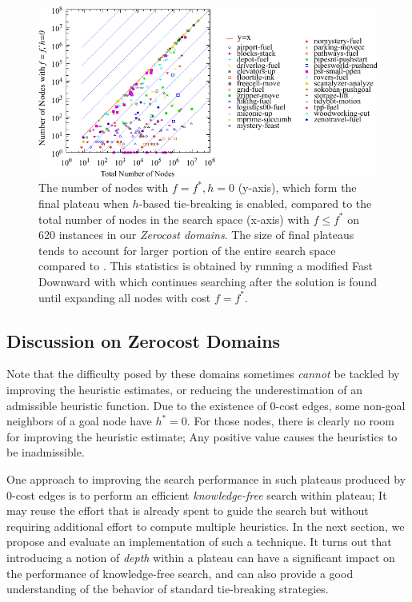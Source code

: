 \begin{figure}[htbp]
  \centering
  \includegraphics{tables/aaai16-frontier/zerocost/lmcut_frontier-front.pdf}
  \caption{
 The number of nodes with $f=f^*, h=0$ (y-axis), which form
  the final plateau when $h$-based tie-breaking is enabled, compared to
 the total number of nodes in the search space (x-axis) with
 $f\leq f^*$ on 620 instances in our \emph{Zerocost domains}.
 The size of final plateaus tends to account for larger portion of the
 entire search space compared to .
 This statistics is obtained by running a modified Fast Downward with
 \lmcut which continues searching after the solution is found
 until expanding all nodes with cost $f=f^*$.
 }
 \label{fig:plateau-zerocost}
\end{figure}

\subsection{Discussion on Zerocost Domains}

Note that the difficulty posed by these domains sometimes \emph{cannot}
be tackled by improving the heuristic estimates, or reducing the
underestimation of an admissible heuristic function.  Due to the
existence of 0-cost edges, some non-goal neighbors of a goal node 
have $h^*=0$. For those nodes,
there is clearly no room for improving the heuristic estimate; Any positive
value causes the heuristics to be inadmissible.

One approach to improving the search performance in such plateaus
produced by 0-cost edges is to perform an efficient
\emph{knowledge-free} search within plateau; It may reuse the effort
that is already spent to guide the search but without requiring 
additional effort to compute multiple heuristics.
In the next section, we propose and evaluate an implementation of
such a technique. It turns out that introducing a notion of \emph{depth} within a plateau can have
a significant impact on the performance of knowledge-free search, and can also 
provide a good  understanding of the behavior of standard tie-breaking strategies.

